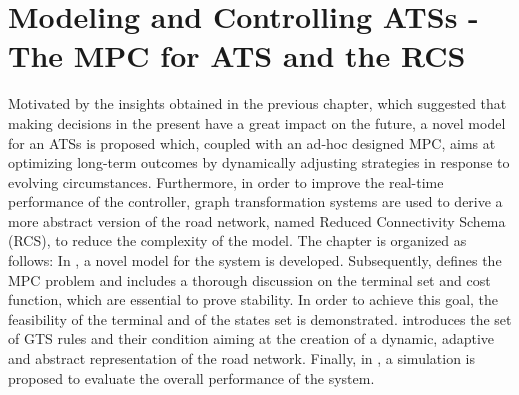 \chapter{Modeling and Controlling ATSs - The MPC for ATS and the RCS}\label{ch:mpc}
Motivated by the insights obtained in the previous chapter, which suggested that making decisions in the present have a great impact on the future, a novel model for an ATSs is proposed which, coupled with an ad-hoc designed MPC, aims at optimizing long-term outcomes by dynamically adjusting strategies in response to evolving circumstances. Furthermore, in order to improve the real-time performance of the controller, graph transformation systems are used to derive a more abstract version of the road network, named Reduced Connectivity Schema (RCS), to reduce the complexity of the model. The chapter is organized as follows:
 In , a novel model for the system is developed. Subsequently,  defines the MPC problem and includes a thorough discussion on the terminal set and cost function, which are essential to prove stability. In order to achieve this goal, the feasibility of the terminal and of the states set is demonstrated.  introduces the set of GTS rules and their condition aiming at the creation of a dynamic, adaptive and abstract representation of the road network. Finally, in , a simulation is proposed to evaluate the overall performance of the system.
